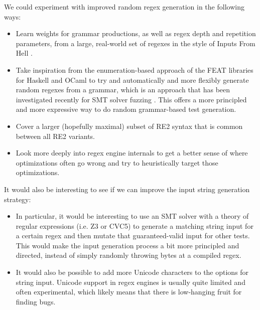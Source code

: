 \documentclass[acmsmall,nonacm,screen]{acmart}
\begin{document}
We could experiment with improved random regex generation in the following ways:
\begin{itemize}
\item Learn weights for grammar productions, as well as regex depth and repetition parameters, from a large, real-world set of regexes in the style of Inputs From Hell \cite{pavese2018inputs}.
\item Take inspiration from the enumeration-based approach of the FEAT libraries for Haskell and OCaml \cite{duregaard2012feat} to try and automatically and more flexibly generate random regexes from a grammar, which is an approach that has been investigated recently for SMT solver fuzzing \cite{winterer2024validating}. This offers a more principled and more expressive way to do random grammar-based test generation.
\item Cover a larger (hopefully maximal) subset of RE2 syntax that is common between all RE2 variants.
\item Look more deeply into regex engine internals to get a better sense of where optimizations often go wrong and try to heuristically target those optimizations.
\end{itemize}

It would also be interesting to see if we can improve the input string generation strategy:
\begin{itemize}
\item In particular, it would be interesting to use an SMT solver with a theory of regular expressions (i.e. Z3 or CVC5) to generate a matching string input for a certain regex \cite{veanes2010rex} and then mutate that guaranteed-valid input for other tests. This would make the input generation process a bit more principled and directed, instead of simply randomly throwing bytes at a compiled regex.
\item It would also be possible to add more Unicode characters to the options for string input. Unicode support in regex engines is usually quite limited and often experimental, which likely means that there is low-hanging fruit for finding bugs.
\end{itemize}



\end{document}
